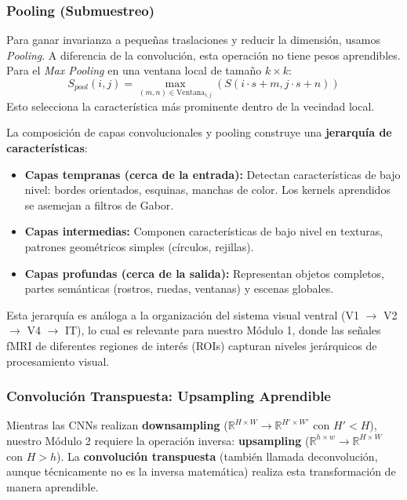\documentclass{article}
\begin{document}
\subsubsection{Pooling (Submuestreo)}
Para ganar invarianza a pequeñas traslaciones y reducir la dimensión, usamos \textit{Pooling}. A diferencia de la convolución, esta operación no tiene pesos aprendibles. Para el \textit{Max Pooling} en una ventana local de tamaño $k \times k$:
\begin{equation}
    S_{pool}(i, j) = \max_{(m, n) \in \text{Ventana}_{i,j}} (S(i \cdot s + m, j \cdot s + n))
\end{equation}
Esto selecciona la característica más prominente dentro de la vecindad local.

La composición de capas convolucionales y pooling construye una \textbf{jerarquía de características}:
\begin{itemize}
    \item \textbf{Capas tempranas (cerca de la entrada):} Detectan características de bajo nivel: bordes orientados, esquinas, manchas de color. Los kernels aprendidos se asemejan a filtros de Gabor.
    \item \textbf{Capas intermedias:} Componen características de bajo nivel en texturas, patrones geométricos simples (círculos, rejillas).
    \item \textbf{Capas profundas (cerca de la salida):} Representan objetos completos, partes semánticas (rostros, ruedas, ventanas) y escenas globales.
\end{itemize}

Esta jerarquía es análoga a la organización del sistema visual ventral (V1 $\rightarrow$ V2 $\rightarrow$ V4 $\rightarrow$ IT), lo cual es relevante para nuestro Módulo 1, donde las señales fMRI de diferentes regiones de interés (ROIs) capturan niveles jerárquicos de procesamiento visual.

\subsubsection{Convolución Transpuesta: Upsampling Aprendible}

Mientras las CNNs realizan \textbf{downsampling} ($\mathbb{R}^{H \times W} \rightarrow \mathbb{R}^{H' \times W'}$ con $H' < H$), nuestro Módulo 2 requiere la operación inversa: \textbf{upsampling} ($\mathbb{R}^{h \times w} \rightarrow \mathbb{R}^{H \times W}$ con $H > h$). La \textbf{convolución transpuesta} (también llamada deconvolución, aunque técnicamente no es la inversa matemática) realiza esta transformación de manera aprendible.
\end{document}
